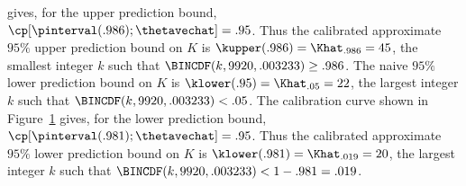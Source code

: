\begin{example}
\begin{figure}
\label{figure:wund1.predict.calibration.ps}
\end{figure}
gives, for the upper prediction bound,
$\cp[\pinterval(.986);\thetavechat]=.95$.
Thus the calibrated approximate $95\%$ upper prediction bound on $K$ is 
$\kupper(.986)=\Khat_{.986}=45$, the  smallest integer $k$ such that
$\BINCDF(k,9920,.003233) \geq .986$.
The naive  $95\%$  lower prediction bound on $K$ is 
$\klower(.95)=\Khat_{.05}=22$, the 
largest integer $k$ such that $\BINCDF(k,9920,.003233) < .05$.
The calibration curve shown in
Figure~\ref{figure:wund1.predict.calibration.ps}
gives, for the lower prediction bound,
$\cp[\pinterval(.981);\thetavechat]=.95$.
Thus the calibrated approximate $95\%$ lower prediction bound on $K$ is 
$\klower(.981)=\Khat_{.019}=20$, the  largest integer $k$ such that
$\BINCDF(k,9920,.003233) < 1-.981 = .019$.
\end{example}

